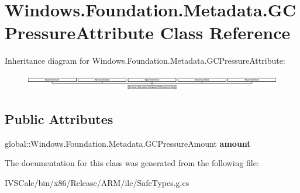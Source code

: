 \hypertarget{class_windows_1_1_foundation_1_1_metadata_1_1_g_c_pressure_attribute}{}\section{Windows.\+Foundation.\+Metadata.\+G\+C\+Pressure\+Attribute Class Reference}
\label{class_windows_1_1_foundation_1_1_metadata_1_1_g_c_pressure_attribute}
Inheritance diagram for Windows.\+Foundation.\+Metadata.\+G\+C\+Pressure\+Attribute\+:\begin{figure}[H]
\begin{center}
\leavevmode
\includegraphics[height=0.715655cm]{class_windows_1_1_foundation_1_1_metadata_1_1_g_c_pressure_attribute}
\end{center}
\end{figure}
\subsection*{Public Attributes}
\begin{DoxyCompactItemize}
\item 
\mbox{\label{class_windows_1_1_foundation_1_1_metadata_1_1_g_c_pressure_attribute_a3f896545b0bb72cd28581d468969ac04}} 
global\+::\+Windows.\+Foundation.\+Metadata.\+G\+C\+Pressure\+Amount {\bfseries amount}
\end{DoxyCompactItemize}


The documentation for this class was generated from the following file\+:\begin{DoxyCompactItemize}
\item 
I\+V\+S\+Calc/bin/x86/\+Release/\+A\+R\+M/ilc/Safe\+Types.\+g.\+cs\end{DoxyCompactItemize}
